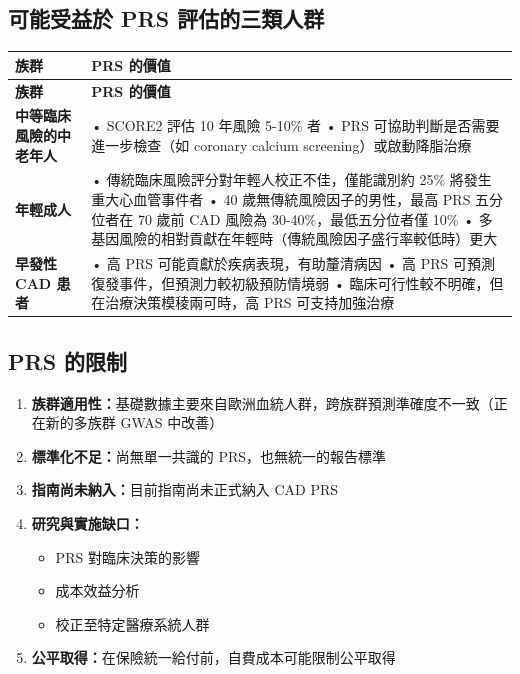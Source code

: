 \documentclass[12pt,a4paper]{article}
\begin{document}
\subsection{可能受益於 PRS 評估的三類人群}

\begin{longtable}{p{3.5cm}p{10cm}}
\toprule
\textbf{族群} & \textbf{PRS 的價值} \\
\midrule
\endfirsthead

\toprule
\textbf{族群} & \textbf{PRS 的價值} \\
\midrule
\endhead

\bottomrule
\endfoot

\textbf{中等臨床風險的中老年人} &
• SCORE2 評估 10 年風險 5-10\% 者\newline
• PRS 可協助判斷是否需要進一步檢查（如 coronary calcium screening）或啟動降脂治療 \\
\midrule
\textbf{年輕成人} &
• 傳統臨床風險評分對年輕人校正不佳，僅能識別約 25\% 將發生重大心血管事件者\newline
• 40 歲無傳統風險因子的男性，最高 PRS 五分位者在 70 歲前 CAD 風險為 30-40\%，最低五分位者僅 10\%\newline
• 多基因風險的相對貢獻在年輕時（傳統風險因子盛行率較低時）更大 \\
\midrule
\textbf{早發性 CAD 患者} &
• 高 PRS 可能貢獻於疾病表現，有助釐清病因\newline
• 高 PRS 可預測復發事件，但預測力較初級預防情境弱\newline
• 臨床可行性較不明確，但在治療決策模稜兩可時，高 PRS 可支持加強治療 \\
\bottomrule
\end{longtable}

\subsection{PRS 的限制}

\begin{enumerate}
    \item \textbf{族群適用性：}基礎數據主要來自歐洲血統人群，跨族群預測準確度不一致（正在新的多族群 GWAS 中改善）
    \item \textbf{標準化不足：}尚無單一共識的 PRS，也無統一的報告標準
    \item \textbf{指南尚未納入：}目前指南尚未正式納入 CAD PRS
    \item \textbf{研究與實施缺口：}
    \begin{itemize}
        \item PRS 對臨床決策的影響
        \item 成本效益分析
        \item 校正至特定醫療系統人群
    \end{itemize}
    \item \textbf{公平取得：}在保險統一給付前，自費成本可能限制公平取得
\end{enumerate}
\end{document}
